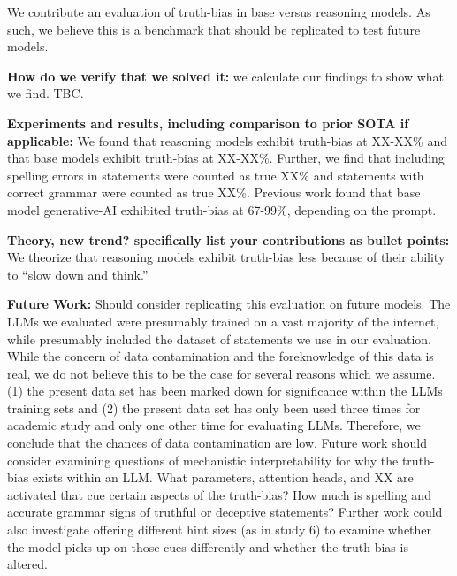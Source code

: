 \documentclass{article}
\begin{document}
We contribute an evaluation of truth-bias in base versus reasoning models. As such, we believe this is a benchmark that should be replicated to test future models.

\textbf{How do we verify that we solved it:} we calculate our findings to show what we find. TBC.

\textbf{Experiments and results, including comparison to prior SOTA if applicable:} We found that reasoning models exhibit truth-bias at XX-XX\% and that base models exhibit truth-bias at XX-XX\%. Further, we find that including spelling errors in statements were counted as true XX\% and statements with correct grammar were counted as true XX\%. Previous work found that base model generative-AI exhibited truth-bias at 67-99\%, depending on the prompt. 


\textbf{Theory, new trend? specifically list your contributions as bullet points:} We theorize that reasoning models exhibit truth-bias less because of their ability to ``slow down and think.'' 

\textbf{Future Work:} Should consider replicating this evaluation on future models. The LLMs we evaluated were presumably trained on a vast majority of the internet, while presumably included the dataset of statements we use in our evaluation. While the concern of data contamination and the foreknowledge of this data is real, we do not believe this to be the case for several reasons which we assume. (1) the present data set has been marked down for significance within the LLMs training sets and (2) the present data set has only been used three times for academic study and only one other time for evaluating LLMs. Therefore, we conclude that the chances of data contamination are low. Future work should consider examining questions of mechanistic interpretability for why the truth-bias exists within an LLM. What parameters, attention heads, and XX are activated that cue certain aspects of the truth-bias? How much is spelling and accurate grammar signs of truthful or deceptive statements? Further work could also investigate offering different hint sizes (as in study 6) to examine whether the model picks up on those cues differently and whether the truth-bias is altered. 
\end{document}
